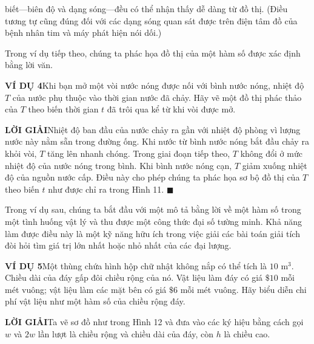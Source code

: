 \begin{minipage}[t]{0.708\textwidth}
    \fontsize{9.3pt}{13.2pt}\selectfont
    biết—biên độ và dạng sóng—đều có thể nhận thấy dễ dàng từ đồ thị. (Điều tương tự cũng đúng đối với các dạng sóng quan sát được trên điện tâm đồ của bệnh nhân tim và máy phát hiện nói dối.)

    Trong ví dụ tiếp theo, chúng ta phác họa đồ thị của một hàm số được xác định bằng lời văn.

    \vspace{0.25cm}
    \noindent
    \textbf{\textsf{\color{stewartcyan}VÍ DỤ 4}}\quad Khi bạn mở một vòi nước nóng được nối với bình nước nóng, nhiệt độ $T$ của nước phụ thuộc vào thời gian nước đã chảy. Hãy vẽ một đồ thị phác thảo của $T$ theo biến thời gian $t$ đã trôi qua kể từ khi vòi được mở.

    \vspace{0.15cm}
    \noindent
    \textbf{\textsf{\color{stewartcyan}LỜI GIẢI}}\quad Nhiệt độ ban đầu của nước chảy ra gần với nhiệt độ phòng vì lượng nước này nằm sẵn trong đường ống. Khi nước từ bình nước nóng bắt đầu chảy ra khỏi vòi, $T$ tăng lên nhanh chóng. Trong giai đoạn tiếp theo, $T$ không đổi ở mức nhiệt độ của nước nóng trong bình. Khi bình nước nóng cạn, $T$ giảm xuống nhiệt độ của nguồn nước cấp. Điều này cho phép chúng ta phác họa sơ bộ đồ thị của $T$ theo biến $t$ như được chỉ ra trong Hình 11. \hfill{\color{stewartcyan}$\blacksquare$}

    \vspace{0.3cm}
    Trong ví dụ sau, chúng ta bắt đầu với một mô tả bằng lời về một hàm số trong một tình huống vật lý và thu được một công thức đại số tường minh. Khả năng làm được điều này là một kỹ năng hữu ích trong việc giải các bài toán giải tích đòi hỏi tìm giá trị lớn nhất hoặc nhỏ nhất của các đại lượng.

    \vspace{0.25cm}
    \noindent
    \textbf{\textsf{\color{stewartcyan}VÍ DỤ 5}}\quad Một thùng chứa hình hộp chữ nhật không nắp có thể tích là $10\text{ m}^3$. Chiều dài của đáy gấp đôi chiều rộng của nó. Vật liệu làm đáy có giá $\$10$ mỗi mét vuông; vật liệu làm các mặt bên có giá $\$6$ mỗi mét vuông. Hãy biểu diễn chi phí vật liệu như một hàm số của chiều rộng đáy.

    \vspace{0.15cm}
    \noindent
    \textbf{\textsf{\color{stewartcyan}LỜI GIẢI}}\quad Ta vẽ sơ đồ như trong Hình 12 và đưa vào các ký hiệu bằng cách gọi $w$ và $2w$ lần lượt là chiều rộng và chiều dài của đáy, còn $h$ là chiều cao.
    

\end{minipage}
